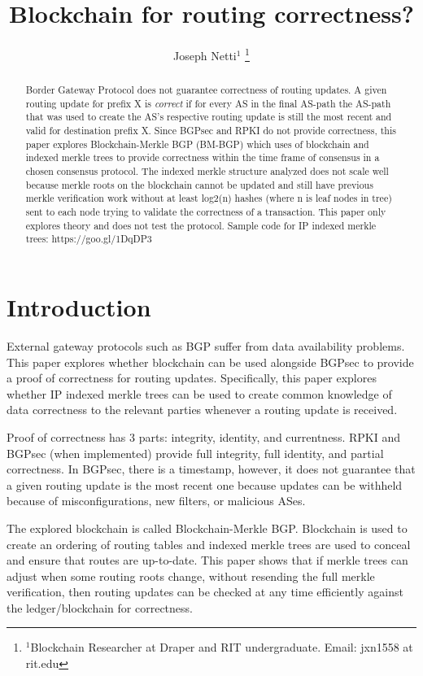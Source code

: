 \documentclass[letterpaper, 10 pt, conference]{ieeeconf}  %
\title{\LARGE \bf
Blockchain for routing correctness?
}
\author{Joseph Netti$^{1}$%
\thanks{$^{1}$Blockchain Researcher at Draper and RIT undergraduate. Email: jxn1558 at rit.edu}%
}
\begin{document}
\maketitle
\thispagestyle{empty}
\pagestyle{empty}


\begin{abstract}
Border Gateway Protocol does not guarantee correctness of routing updates. A given routing update for prefix X is \textit{correct} if for every AS in the final AS-path the AS-path that was used to create the AS’s respective routing update is still the most recent and valid for destination prefix X. Since BGPsec and RPKI do not provide correctness, this paper explores Blockchain-Merkle BGP (BM-BGP) which uses of blockchain and indexed merkle trees to provide correctness within the time frame of consensus in a chosen consensus protocol. The indexed merkle structure analyzed does not scale well because merkle roots on the blockchain cannot be updated and still have previous merkle verification work without at least log2(n) hashes (where n is leaf nodes in tree) sent to each node trying to validate the correctness of a transaction. This paper only explores theory and does not test the protocol. Sample code for IP indexed merkle trees: https://goo.gl/1DqDP3


\end{abstract}

\section{Introduction}
External gateway protocols such as BGP suffer from data availability problems. This paper explores whether blockchain can be used alongside BGPsec to provide a proof of correctness for routing updates. Specifically, this paper explores whether IP indexed merkle trees can be used to create common knowledge of data correctness to the relevant parties whenever a routing update is received.

Proof of correctness has 3 parts: integrity, identity, and currentness. RPKI and BGPsec (when implemented) provide full integrity, full identity, and partial correctness. In BGPsec, there is a timestamp, however, it does not guarantee that a given routing update is the most recent one because updates can be withheld because of misconfigurations, new filters, or malicious ASes. 

The explored blockchain is called Blockchain-Merkle BGP. Blockchain is used to create an ordering of routing tables and indexed merkle trees are used to conceal and ensure that routes are up-to-date. This paper shows that if merkle trees can adjust when some routing roots change, without resending the full merkle verification, then routing updates can be checked at any time efficiently against the ledger/blockchain for correctness.
\end{document}
